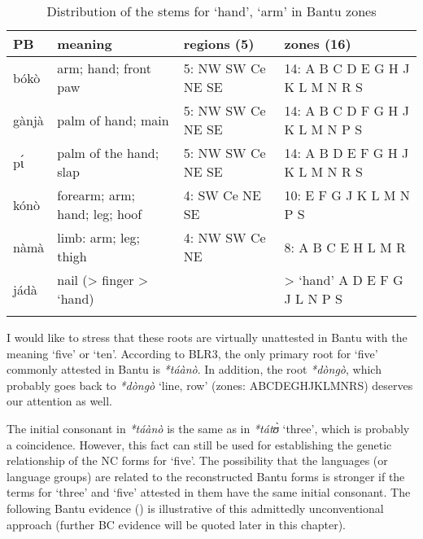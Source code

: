 \begin{table}
\caption{\label{tab:4:17}Distribution of the stems for `hand', `arm' in Bantu zones}


\begin{tabularx}{\textwidth}{lQlQ}
\lsptoprule

PB & meaning & regions (5) & zones (16)\\
\midrule
bókò & arm; hand; front paw & 5: NW SW Ce NE SE & 14: A B C D E G H J K L M N R S\\
gànjà & palm of hand; main & 5: NW SW Ce NE SE & 14: A B C D F G H J K L M N P S\\
p{\'{ɩ}} & palm of the hand; slap & 5: NW SW Ce NE SE & 14: A B D E F G H J K L M N R S\\
kónò & forearm; arm; hand; leg; hoof & 4: SW Ce NE SE & 10: E F G J K L M N P S\\
nàmà & limb: arm; leg; thigh & 4: NW SW Ce NE & 8: A B C E H L M R\\
jádà & nail (> finger > `hand) &  & > `hand'   A D E F G J L N P S\\
\lspbottomrule
\end{tabularx}

\end{table}

I would like to stress that these roots are virtually unattested in Bantu with the meaning ‘five’ or ‘ten’. According to BLR3, the only primary root for ‘five’ commonly attested in Bantu is \textit{*táànò}. In addition, the root \textit{*dòngò}, which probably goes back to \textit{*dòngò} ‘line, row’ (zones: ABCDEGHJKLMNRS) deserves our attention as well.

The initial consonant in \textit{*táànò} is the same as in \textit{*tát{\`{ʊ}}} ‘three’, which is probably a coincidence. However, this fact can still be used for establishing the genetic relationship of the NC forms for ‘five’. The possibility that the languages (or language groups) are related to the reconstructed Bantu forms is stronger if the terms for ‘three’ and ‘five’ attested in them have the same initial consonant. The following Bantu evidence () is illustrative of this admittedly unconventional approach (further BC evidence will be quoted later in this chapter).


